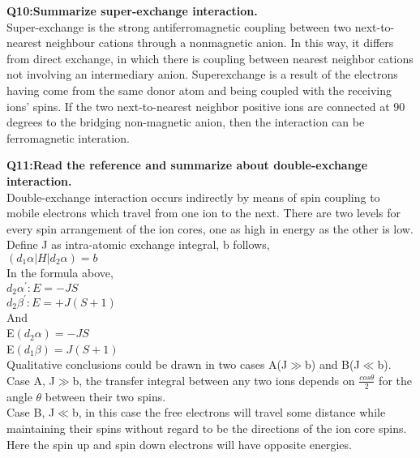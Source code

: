 \documentclass{article}
\begin{document}
\newpage
\noindent \textbf{Q10:Summarize super-exchange interaction.}\\
Super-exchange is the strong antiferromagnetic coupling between two next-to-nearest neighbour cations through a nonmagnetic anion.
In this way, it differs from direct exchange, in which there is coupling between nearest neighbor cations not involving an intermediary anion. 
Superexchange is a result of the electrons having come from the same donor atom and being coupled with the receiving ions' spins. 
If the two next-to-nearest neighbor positive ions are connected at 90 degrees to the bridging non-magnetic anion, then the interaction can be ferromagnetic interation.


\newpage
\noindent \textbf{Q11:Read the reference and summarize about double-exchange interaction.}\\
\noindent Double-exchange interaction occurs indirectly by means of spin coupling to mobile electrons which travel from one ion to the next. There are two levels for every spin arrangement of the ion cores, one as high in energy as the other is low.
\noindent Define J as intra-atomic exchange integral, b follows,\\
\noindent $(d_1\alpha|H|d_2\alpha)=b$\\
\noindent In the formula above, \\
\noindent $d_2\alpha^{'}:E=-JS$\\
\noindent $d_2\beta^{'}:E=+J(S+1)$\\
\noindent And\\
\noindent E$(d_2\alpha)=-JS$\\
\noindent E$(d_1\beta)=J(S+1)$\\
\noindent Qualitative conclusions could be drawn in two cases A(J$\gg$b) and B(J$\ll$b). \\
\noindent Case A, J$\gg$b, the transfer integral between any two ions depends on $\frac{cos \theta}{2}$ for the angle $\theta$ between their two spins. \\
\noindent Case B, J$\ll$b, in this case the free electrons will travel some distance while maintaining their spins without regard to be the directions of the ion core spins. Here the spin up and spin down electrons will have opposite energies. 
\end{document}
